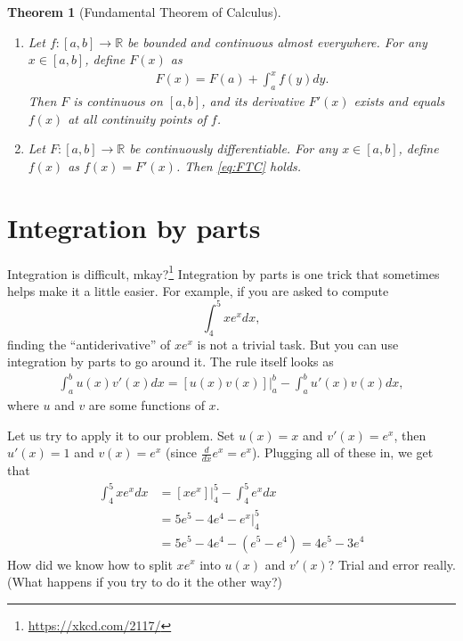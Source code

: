 \documentclass{article}
\newtheorem{theorem}{Theorem}
\begin{document}
\begin{theorem}[Fundamental Theorem of Calculus]
	\,
	\begin{enumerate}
		\item Let $f:[a,b] \to \mathbb{R}$ be bounded and continuous almost everywhere. For any $x \in [a,b]$, define $F(x)$ as
		\begin{align} \label{eq:FTC}
			F(x) = F(a) + \int_a^x f(y) dy.
		\end{align}
		Then $F$ is continuous on $[a,b]$, and its derivative $F'(x)$ exists and equals $f(x)$ at all continuity points of $f$.
		
		\item Let $F:[a,b] \to \mathbb{R}$ be continuously differentiable. For any $x \in [a,b]$, define $f(x)$ as $f(x)=F'(x)$. Then \eqref{eq:FTC} holds.
	\end{enumerate}
\end{theorem}




\section{Integration by parts}

Integration is difficult, mkay?\footnote{\url{https://xkcd.com/2117/}} Integration by parts is one trick that sometimes helps make it a little easier. For example, if you are asked to compute 
$$\int_4^5 xe^x dx,$$ finding the ``antiderivative'' of $xe^x$ is not a trivial task. But you can use integration by parts to go around it. The rule itself looks as
\begin{align} \label{eq:IBP}
	\int_a^b u(x) v'(x) dx = [u(x)v(x)]|_a^b - \int_a^b u'(x) v(x) dx,
\end{align}
where $u$ and $v$ are some functions of $x$. 

Let us try to apply it to our problem. Set $u(x)=x$ and $v'(x)=e^x$, then $u'(x)=1$ and $v(x)=e^x$ (since $\frac{d}{dx}e^x = e^x$). Plugging all of these in, we get that
\begin{align*}
	\int_4^5 xe^x dx &= \left.\left[xe^x\right]\right|_4^5 - \int_4^5 e^x dx
	\\
	&=5e^5 - 4e^4 - \left. e^x \right|_4^5
	\\
	&=5e^5 - 4e^4 - \left(e^5 - e^4\right) = 4e^5 - 3e^4
\end{align*}
How did we know how to split $xe^x$ into $u(x)$ and $v'(x)$? Trial and error really. (What happens if you try to do it the other way?)
\end{document}
